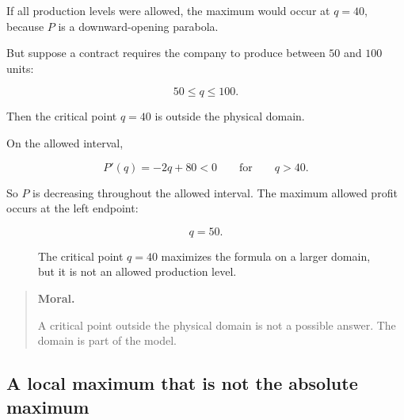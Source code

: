 If all production levels were allowed, the maximum would occur at \(q=40\), because
\(P\) is a downward-opening parabola.

But suppose a contract requires the company to produce between \(50\) and \(100\)
units:

\[
50\le q\le 100.
\]

Then the critical point \(q=40\) is outside the physical domain.

On the allowed interval,

\[
P'(q)=-2q+80<0
\qquad\text{for}\qquad q>40.
\]

So \(P\) is decreasing throughout the allowed interval.  The maximum allowed profit
occurs at the left endpoint:

\[
\boxed{q=50.}
\]

\begin{figure}[h]
\centering
{}
\caption{The critical point \(q=40\) maximizes the formula on a larger domain, but it is not an allowed production level.}
\label{fig:critical-point-outside-domain}
\end{figure}

\begin{quote}
\textbf{Moral.}

A critical point outside the physical domain is not a possible answer.  The domain is
part of the model.
\end{quote}

\subsection{A local maximum that is not the absolute maximum}
\label{subsec:local-max-not-absolute}

